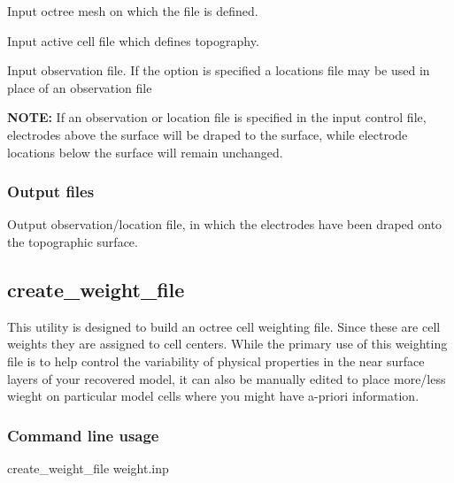 \begin{description}[leftmargin=5cm, style=sameline, align=left]
\item[\fileName{input octree mesh}] Input octree mesh on which the  file is defined.
\item[\fileName{topography active cell}] Input active cell file which defines topography.
\item[\fileName{LOC\_XY(Z)}] Input observation file. If the  option is specified a locations file may be used in place of an observation file
\end{description}

\textbf{NOTE:} If an  observation or location file is specified in the input control file, electrodes above the surface will be draped to the surface, while electrode locations below the surface will remain unchanged.

\subsubsection{Output files}

\begin{description}[leftmargin=5cm, style=sameline, align=left]
\item[\fileName{LOC\_XYZ}] Output observation/location file, in which the electrodes have been draped onto the topographic surface.
\end{description}

\subsection{create\_weight\_file}
 
This utility is designed to build an octree cell weighting file. Since these are cell weights they are assigned to cell centers. While the primary use of this weighting file is to help control the variability of physical properties in the near surface layers of your recovered model, it can also be manually edited to place more/less wieght on particular model cells where you might have a-priori information.  

\subsubsection{Command line usage}

\begin{fileExample}
create\_weight\_file weight.inp
\end{fileExample}

